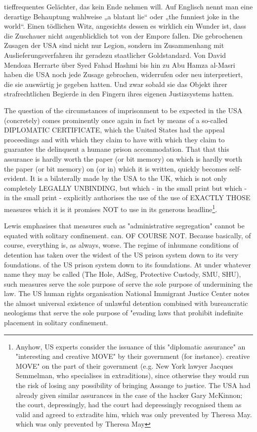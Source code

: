 \begin{multicols}{2}
{tieffrequentes Gelächter, das kein Ende nehmen will.
\textCR
Auf Englisch nennt man eine derartige Behauptung
wahlweise „a blatant lie“ oder „the funniest joke in the
world“. Einen tödlichen Witz, angesichts dessen es wirklich ein Wunder ist, dass die Zuschauer nicht augenblicklich tot von der Empore fallen. Die gebrochenen
Zusagen der USA sind nicht nur Legion, sondern im Zusammenhang mit Auslieferungsverfahren ihr geradezu
staatlicher Goldstandard. Von David Mendoza Herrarte
über Syed Fahad Hashmi bis hin zu Abu Hamza al-Masri haben die USA noch jede Zusage gebrochen, widerrufen oder neu interpretiert, die sie auswärtig je gegeben
hatten. Und zwar sobald sie das Objekt ihrer strafrechtlichen Begierde in den Fingern ihres eigenen Justizsystems hatten.}


The question of the circumstances of imprisonment to be expected in the USA (concretely) comes prominently once again in fact
by means of a so-called DIPLOMATIC CERTIFICATE, which the United States had
the appeal proceedings and with which they claim to have
with which they claim to guarantee the delinquent a humane prison accommodation. That
that this assurance is hardly worth the paper (or bit memory) on which
is hardly worth the paper (or bit memory) on (or in) which it is written,
quickly becomes self-evident. It is a
bilaterally made by the USA to the UK, which is not only completely LEGALLY UNBINDING, but which - in the small print
but which - in the small print - explicitly authorises the use of
the use of EXACTLY THOSE measures which it is
it promises NOT to use in its generous headline\footnote[14]{Anyhow, US experts consider the issuance of this "diplomatic assurance" an "interesting and creative MOVE" by their government (for instance).
creative MOVE" on the part of their government (e.g. New York lawyer Jacques Semmelman, who specialises in extraditions), since otherwise they would run the risk of losing any possibility of bringing Assange to justice. The USA had already given similar assurances in the case of the hacker Gary McKinnon; the court, depressingly, had
the court had depressingly recognised them as valid and agreed to extradite him, which was only prevented by Theresa May.
which was only prevented by Theresa May}.

Lewis emphasises that measures such as "administrative segregation" cannot be equated with solitary confinement.
can. OF COURSE NOT. Because basically, of course, everything is, as always, worse. The regime of inhumane conditions of detention has taken over the widest
of the US prison system down to its very foundations.
of the US prison system down to its foundations. At
under whatever name they may be called (The Hole, AdSeg, Protective Custody, SMU, SHU), such measures serve the sole purpose of
serve the sole purpose of undermining the law.
The US human rights organisation National Immigrant Justice Center notes the almost universal existence of unlawful detention combined with bureaucratic neologisms that serve the sole purpose of "evading laws that prohibit indefinite placement in solitary confinement.


\end{multicols}
